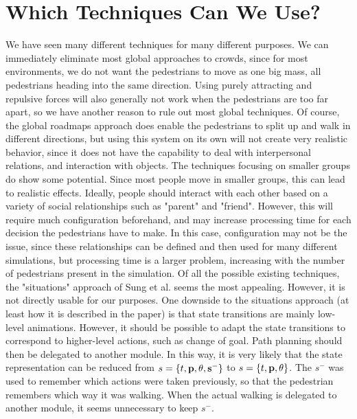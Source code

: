 \documentclass[11pt]{book}
\begin{document}
\section{Which Techniques Can We Use?}
We have seen many different techniques for many different purposes. We can immediately eliminate most global approaches to  crowds, since for most environments, we do not want the pedestrians to move as one big mass, all pedestrians heading into the same direction. Using purely attracting and repulsive forces will also generally not work when the pedestrians are too far apart, so we have another reason to rule out most global techniques. Of course, the global roadmaps approach does enable the pedestrians to split up and walk in different directions, but using this system on its own will not create very realistic behavior, since it does not have the capability to deal with interpersonal relations, and interaction with objects.
The techniques focusing on smaller groups do show some potential. Since most people move in smaller groups, this can lead to realistic effects. Ideally, people should interact with each other based on a variety of social relationships such as "parent" and "friend". However, this will require much configuration beforehand, and may increase processing time for each decision the pedestrians have to make. In this case, configuration may not be the issue, since these relationships can be defined and then used for many different simulations, but processing time is a larger problem, increasing with the number of pedestrians present in the simulation.
Of all the possible existing techniques, the "situations" approach of Sung et al. seems the most appealing. However, it is not directly usable for our purposes. One downside to the situations approach (at least how it is described in the paper) is that state transitions are mainly low-level animations. However, it should be possible to adapt the state transitions to correspond to higher-level actions, such as change of goal. Path planning should then be delegated to another module. In this way, it is very likely that the state representation can be reduced from $s = \{t, \bf{p}, \theta, s^- \}$ to $s = \{t, \bf{p}, \theta\}$. The $s^-$ was used to remember which actions were taken previously, so that the pedestrian remembers which way it was walking. When the actual walking is delegated to another module, it seems unnecessary to keep $s^-$.
\end{document}
